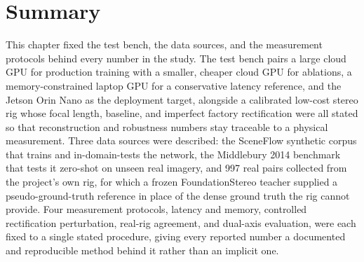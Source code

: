 \section{Summary}
This chapter fixed the test bench, the data sources, and the
measurement protocols behind every number in the study. The test bench
pairs a large cloud GPU for production training with a smaller,
cheaper cloud GPU for ablations, a memory-constrained laptop GPU for a
conservative latency reference, and the Jetson Orin Nano as the
deployment target, alongside a calibrated low-cost stereo rig whose
focal length, baseline, and imperfect factory rectification were all
stated so that reconstruction and robustness numbers stay traceable to
a physical measurement. Three data sources were
described: the SceneFlow synthetic corpus that trains and
in-domain-tests the network, the Middlebury 2014 benchmark that tests
it zero-shot on unseen real imagery, and 997 real pairs collected from
the project's own rig, for which a frozen FoundationStereo teacher
supplied a pseudo-ground-truth reference in place of the dense ground
truth the rig cannot provide. Four measurement protocols, latency and
memory, controlled rectification perturbation, real-rig agreement, and
dual-axis evaluation, were each fixed to a single stated procedure,
giving every reported number a documented and reproducible method
behind it rather than an implicit one.

